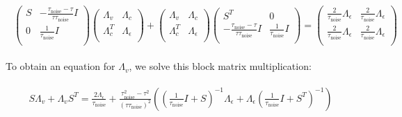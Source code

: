 \documentclass[11pt]{article}
\begin{document}
\begin{align}
\begin{split}
\begin{pmatrix}
	S & -\frac{\tau_{\text{noise}}-\tau}{\tau \tau_{\text{noise}}}I\\
	 0&\frac{1}{\tau_{\text{noise}}}I\\
\end{pmatrix}
\begin{pmatrix}
	\Lambda_v & \Lambda_c\\
	 \Lambda_c^T&\Lambda_\epsilon\\
\end{pmatrix}
+
\begin{pmatrix}
	\Lambda_v & \Lambda_c\\
	 \Lambda_c ^T &\Lambda_\epsilon\\
\end{pmatrix}
\begin{pmatrix}
	S^T & 0\\
	 -\frac{\tau_{\text{noise}}-\tau}{\tau \tau_{\text{noise}}}I&\frac{1}{\tau_{\text{noise}}}I\\
\end{pmatrix}
=
\begin{pmatrix}
	\frac{2}{\tau_{\text{noise}}} \Lambda_\epsilon&\frac{2}{\tau_{\text{noise}}} \Lambda_\epsilon\\
	\frac{2}{\tau_{\text{noise}}} \Lambda_\epsilon&\frac{2}{\tau_{\text{noise}}} \Lambda_\epsilon \\
	\end{pmatrix}
\end{split}
\end{align}

To obtain an equation for $\Lambda_v$, we solve this block matrix multiplication:


\begin{align}
\begin{split}
S\Lambda_v +\Lambda_v S^T =\frac{2 \Lambda_\epsilon }{\tau_{\text{noise}} }+\frac{\tau_{\text{noise}}^2 -\tau^2 }{(\tau  \tau_{\text{noise}} )^2}\left( (\frac{1}{\tau_{\text{noise}}}I + S)^{-1} \Lambda_\epsilon+   \Lambda_\epsilon(\frac{1}{\tau_{\text{noise}}}I + S^T)^{-1}\right)  \\
\end{split}
\end{align}
\end{document}
